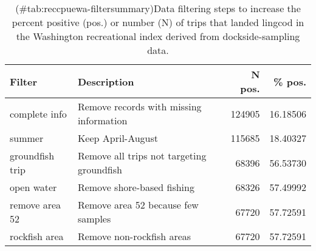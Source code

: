 
\begin{longtable}[t]{llrr}
\caption{(\#tab:reccpuewa-filtersummary)Data filtering steps to increase the percent positive (pos.) or number (N) of trips that landed lingcod  in the Washington recreational index derived from dockside-sampling data.}\\
\toprule
Filter & Description & N pos. & \% pos.\\
\midrule
complete info & Remove records with missing information & 124905 & 16.18506\\
summer & Keep April-August & 115685 & 18.40327\\
groundfish trip & Remove all trips not targeting groundfish & 68396 & 56.53730\\
open water & Remove shore-based fishing & 68326 & 57.49992\\
remove area 52 & Remove area 52 because few samples & 67720 & 57.72591\\
\addlinespace
rockfish area & Remove non-rockfish areas & 67720 & 57.72591\\
\bottomrule
\end{longtable}
